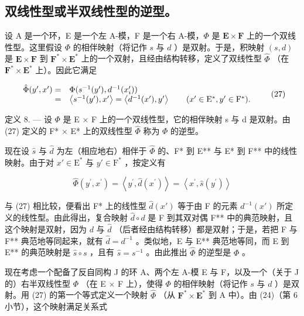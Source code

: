 \subsection{双线性型或半双线性型的逆型。}

设 A 是一个环，E 是一个左 A-模，F 是一个右 A-模，\(\Phi\) 是 \(\mathbf{E} \times \mathbf{F}\) 上的一个双线性型。这里假设 \(\Phi\) 的相伴映射（将记作 \(s\) 与 \(d\) ）是双射。于是，积映射 \((s, d)\) 是 \(\mathbf{E} \times \mathbf{F}\) 到 \(\mathbf{F}^* \times \mathbf{E}^*\) 上的一个双射，且经由结构转移，定义了双线性型 \(\hat{\Phi}\) （在 \(\mathbf{F}^* \times \mathbf{E}^*\) 上）。因此它满足

\[
\begin{array}{r l} \hat {\Phi} (y ^ {\prime}, x ^ {\prime}) = & \Phi (s ^ {- 1} (y ^ {\prime}), d ^ {- 1} (x _ {i} ^ {\prime})) \\ = & \left\langle s ^ {- 1} (y ^ {\prime}), x ^ {\prime} \right\rangle = \left\langle d ^ {- 1} (x ^ {\prime}), y ^ {\prime} \right\rangle \qquad (x ^ {\prime} \in \mathrm{E} ^ {*}, y ^ {\prime} \in \mathrm{F} ^ {*}). \end{array}\tag{27}
\]

定义 8. --- 设 \(\Phi\) 是 E × F 上的一个双线性型，它的相伴映射 s 与 d 是双射。由 (27) 定义的 F* × E* 上的双线性型 \(\hat{\Phi}\) 称为 \(\Phi\) 的逆型。

现在设 \(\hat{s}\) 与 \(\hat{d}\) 为左（相应地右）相伴于 \(\hat{\Phi}\) 的、F* 到 E** 与 E* 到 F** 中的线性映射。由于对 \(x' \in \mathrm{E}^*\) 与 \(y' \in \mathrm{F}^*\) ，按定义有

\[
\hat {\Phi} (y ^ {\prime}, x ^ {\prime}) = \left\langle y ^ {\prime}, \hat {d} (x ^ {\prime}) \right\rangle = \left\langle x ^ {\prime}, \hat {s} (y ^ {\prime}) \right\rangle
\]

与 (27) 相比较，便看出 F* 上的线性型 \(\hat{d}(x')\) 等于由 F 的元素 \(d^{-1}(x')\) 所定义的线性型。由此得出，复合映射 \(\hat{d} \circ d\) 是 F 到其双对偶 F** 中的典范映射，且这个映射是双射，因为 \(d\) 与 \(\hat{d}\) （后者经由结构转移）都是双射；于是，若把 F 与 F** 典范地等同起来，就有 \(\hat{d} = d^{-1}\) 。类似地，E 与 E** 典范地等同，而 E 到 E** 的典范映射是 \(\hat{s} \circ s\) ，且有 \(\hat{s} = s^{-1}\) 。由此推出 \(\hat{\Phi}\) 的逆型是 \(\Phi\) 。

现在考虑一个配备了反自同构 J 的环 A、两个左 A-模 E 与 F，以及一个（关于 J 的）右半双线性型 \(\Phi\) （在 E \(\times\) F 上），使得 \(\Phi\) 的相伴映射（将记作 \(s\) 与 \(d\) ）是双射。用 (27) 的第一个等式定义一个映射 \(\hat{\Phi}\) （从 \(\mathbf{F}^{*} \times \mathbf{E}^{*}\) 到 A 中）。由 (24)（第 6 小节），这个映射满足关系式

